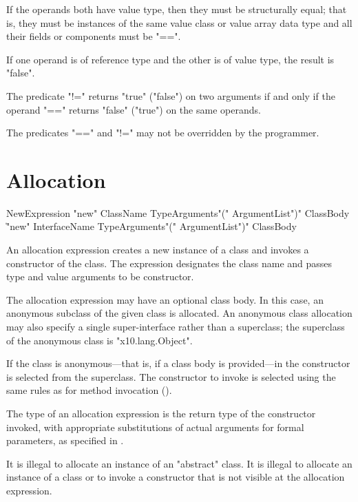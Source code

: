 If the operands both have value type, then they must be structurally equal;
that is, they must be instances of the same value class or value array
data type and all their fields or components must be \xcd"==". 

If one operand is of reference type and the other is of value type,
the result is \xcd"false".

The predicate \xcd"!=" returns \xcd"true" (\xcd"false") on two
arguments if and only if the operand \xcd"==" returns \xcd"false"
(\xcd"true") on the same operands.

The predicates \xcd"==" and \xcd"!=" may not be overridden by the
programmer.

\section{Allocation}
\label{ClassCreation}

\begin{grammar}
NewExpression \: \xcd"new" ClassName TypeArguments\opt \xcd"(" ArgumentList\opt \xcd")"
        ClassBody\opt \\
  \| \xcd"new" InterfaceName TypeArguments\opt \xcd"(" ArgumentList\opt \xcd")"
        ClassBody
\end{grammar}

An allocation expression creates a new instance of a class and
invokes a constructor of the class.
The expression designates the class name and passes
type and value arguments to be constructor.

The allocation expression may have an optional class body.
In this case, an anonymous subclass of the given class is
allocated.   An anonymous class allocation may also specify a
single super-interface rather than a superclass; the superclass
of the anonymous class is \xcd"x10.lang.Object".

If the class is anonymous---that is, if a class body is
provided---in the constructor is selected from the superclass.
The constructor to invoke is selected using the same rules as
for method invocation ().

The type of an allocation expression
is the return type of the constructor invoked, with appropriate
substitutions  of actual arguments for formal parameters, as
specified in .

It is illegal to allocate an instance of an \xcd"abstract" class.
It is illegal to allocate an instance of a class or to invoke a
constructor that is not visible at
the allocation expression.


